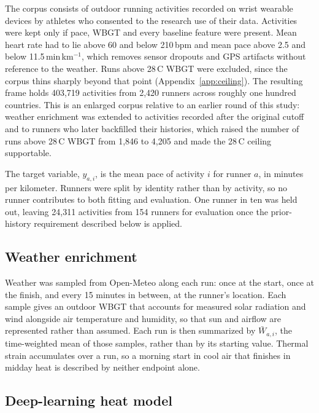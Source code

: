 \documentclass[11pt]{article}
\renewcommand{\_}{\textunderscore\allowbreak}
\begin{document}
The corpus consists of outdoor running activities recorded on wrist wearable devices by athletes who consented to the research use of their data. Activities were kept only if pace, WBGT and every baseline feature were present. Mean heart rate had to lie above 60 and below 210\,bpm and mean pace above 2.5 and below 11.5\,min\,km$^{-1}$, which removes sensor dropouts and GPS artifacts without reference to the weather. Runs above 28\,\textdegree C WBGT were excluded, since the corpus thins sharply beyond that point (Appendix~\ref{app:ceiling}). The resulting frame holds 403{,}719 activities from 2{,}420 runners across roughly one hundred countries. This is an enlarged corpus relative to an earlier round of this study: weather enrichment was extended to activities recorded after the original cutoff and to runners who later backfilled their histories, which raised the number of runs above 28\,\textdegree C WBGT from 1{,}846 to 4{,}205 and made the 28\,\textdegree C ceiling supportable.

The target variable, $y_{a,i}$, is the mean pace of activity $i$ for runner $a$, in minutes per kilometer. Runners were split by identity rather than by activity, so no runner contributes to both fitting and evaluation. One runner in ten was held out, leaving 24{,}311 activities from 154 runners for evaluation once the prior-history requirement described below is applied.

\subsection{Weather enrichment}

Weather was sampled from Open-Meteo along each run: once at the start, once at the finish, and every 15 minutes in between, at the runner's location. Each sample gives an outdoor WBGT that accounts for measured solar radiation and wind alongside air temperature and humidity, so that sun and airflow are represented rather than assumed. Each run is then summarized by $\bar{W}_{a,i}$, the time-weighted mean of those samples, rather than by its starting value. Thermal strain accumulates over a run, so a morning start in cool air that finishes in midday heat is described by neither endpoint alone.

\subsection{Deep-learning heat model}
\end{document}
